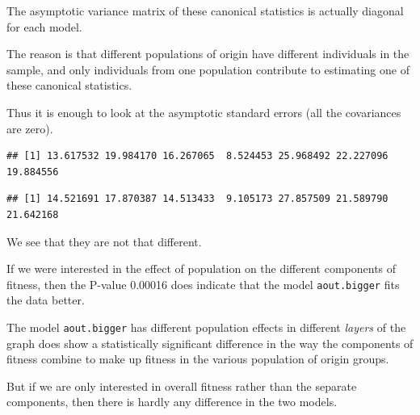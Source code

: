 \documentclass[
  ignorenonframetext,
]{beamer}
\newenvironment{Shaded}{\begin{snugshade}}{\end{snugshade}}
\newcommand{\NormalTok}[1]{#1}
\newcommand{\SpecialCharTok}[1]{\textcolor[rgb]{0.00,0.00,0.00}{#1}}
\begin{document}
\begin{frame}[fragile]{}
\protect\hypertarget{section-24}{}
The asymptotic variance matrix of these canonical statistics is actually
diagonal for each model.

The reason is that different populations of origin have different
individuals in the sample, and only individuals from one population
contribute to estimating one of these canonical statistics.

Thus it is enough to look at the asymptotic standard errors (all the
covariances are zero).

\vspace{12pt}
\tiny

\begin{Shaded}
\end{Shaded}

\begin{verbatim}
## [1] 13.617532 19.984170 16.267065  8.524453 25.968492 22.227096 19.884556
\end{verbatim}

\begin{Shaded}
\end{Shaded}

\begin{verbatim}
## [1] 14.521691 17.870387 14.513433  9.105173 27.857509 21.589790 21.642168
\end{verbatim}

\vspace{12pt}
\normalsize

We see that they are not that different.
\end{frame}

\begin{frame}{}
\protect\hypertarget{section-25}{}
If we were interested in the effect of population on the different
components of fitness, then the P-value 0.00016 does indicate that the
model \texttt{aout.bigger} fits the data better.

The model \texttt{aout.bigger} has different population effects in
different \emph{layers} of the graph does show a statistically
significant difference in the way the components of fitness combine to
make up fitness in the various population of origin groups.

But if we are only interested in overall fitness rather than the
separate components, then there is hardly any difference in the two
models.
\end{frame}
\end{document}
